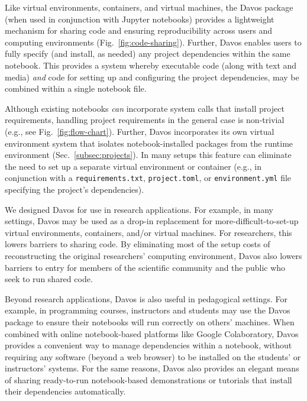 \documentclass[preprint,12pt,a4paper]{elsarticle}
\begin{document}
Like virtual environments, containers, and virtual machines, the
Davos package (when used in conjunction with Jupyter
notebooks) provides a light\-weight mechanism for sharing code and
ensuring reproducibility across users and computing environments
(Fig.~\ref{fig:code-sharing}). Further, Davos enables users
to fully specify (and install, as needed) any project dependencies
within the same notebook. This provides a system whereby executable
code (along with text and media) \textit{and} code for setting up and
configuring the project dependencies, may be combined within a single
notebook file.

Although existing notebooks \textit{can} incorporate system calls that install
project requirements, handling project requirements in the general case is
non-trivial (e.g., see Fig.~\ref{fig:flow-chart}). Further, Davos
incorporates its own virtual environment system that isolates
notebook-installed packages from the runtime environment
(Sec.~\ref{subsec:projects}). In many setups this feature can eliminate the
need to set up a separate virtual environment or container (e.g., in
conjunction with a \texttt{requirements.txt}, \texttt{project.toml}, or
\texttt{environment.yml} file specifying the project's dependencies).

We designed Davos for use in research applications. For
example, in many settings, Davos may be used as a drop-in
replacement for more-difficult-to-set-up virtual environments,
containers, and/or virtual machines. For researchers, this lowers
barriers to sharing code. By eliminating most of the setup costs of
reconstructing the original researchers' computing environment,
Davos also lowers barriers to entry for members of the
scientific community and the public who seek to run shared code.

Beyond research applications, Davos is also useful in
pedagogical settings. For example, in programming courses, instructors
and students may use the Davos package to ensure their
notebooks will run correctly on others' machines. When combined with
online notebook-based platforms like Google Colaboratory,
Davos provides a convenient way to manage dependencies within
a notebook, without requiring any software (beyond a web browser) to
be installed on the students' or instructors' systems. For the same
reasons, Davos also provides an elegant means of sharing
ready-to-run notebook-based demonstrations or tutorials that install
their dependencies automatically.
\end{document}
